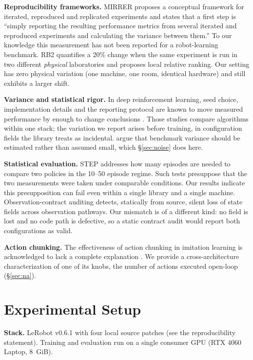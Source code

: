 \documentclass[11pt]{article}
\begin{document}
\textbf{Reproducibility frameworks.} MIRRER \cite{mirrer} proposes a conceptual
framework for iterated, reproduced and replicated experiments and states that a
first step is ``simply reporting the resulting performance metrics from several
iterated and reproduced experiments and calculating the variance between them.''
To our knowledge this measurement has not been reported for a robot-learning
benchmark.
RB2 \cite{rb2} quantifies a 20\% change when the same experiment is run in two
different \emph{physical} laboratories and proposes local relative ranking. Our
setting has zero physical variation (one machine, one room, identical hardware)
and still exhibits a larger shift.

\textbf{Variance and statistical rigor.} In deep reinforcement learning, seed
choice, implementation details and the reporting protocol are known to move
measured performance by enough to change conclusions
\cite{henderson,engstrom,agarwal,bouthillier}. Those studies compare
algorithms within one stack; the variation we report arises before training, in
configuration fields the library treats as incidental. \cite{bouthillier}
argue that benchmark variance should be estimated rather than assumed small,
which \S\ref{sec:noise} does here.

\textbf{Statistical evaluation.} STEP \cite{step} addresses how many episodes are
needed to compare two policies in the 10--50 episode regime. Such tests presuppose
that the two measurements were taken under comparable conditions. Our results
indicate this presupposition can fail even within a single library and a single
machine. Observation-contract auditing \cite{obscontract} detects, statically from
source, silent loss of state fields across observation pathways. Our mismatch is of
a different kind: no field is lost and no code path is defective, so a static
contract audit would report both configurations as valid.

\textbf{Action chunking.} The effectiveness of action chunking in imitation
learning is acknowledged to lack a complete explanation \cite{qchunk}. We provide a
cross-architecture characterization of one of its knobs, the number of actions
executed open-loop (\S\ref{sec:na}).

\section{Experimental Setup}
\label{sec:setup}

\textbf{Stack.} LeRobot v0.6.1 with four local source patches (see the
reproducibility statement). Training and evaluation run on a single consumer GPU
(RTX 4060 Laptop, 8~GiB).
\end{document}
